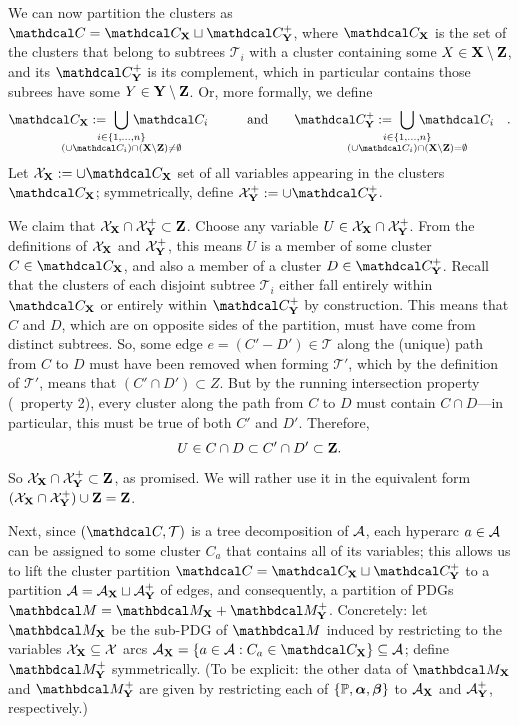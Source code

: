 \begin{subappendices}
\begin{lproof}
    \def\CX{\C_{\mat X}}
    \def\CNX{\C_{\mat{Y}}^+}
    We can now partition the clusters as $\C = \CX \sqcup \CNX$, where
    $\CX$ is the set of the clusters that belong to subtrees $\mathcal T_i$ with a cluster containing some $X \in \mathbf X \setminus \mathbf Z$, and
    its $\CNX$ is its complement, which in particular contains those subrees have some $Y \in \mathbf Y \setminus \mathbf Z$.
    Or, more formally, we define
    \[
        \CX :=~ \bigcup_{\mathclap{\substack{i \in \{1,\ldots,n\}\\ (\cup\C_i) \cap (\mat X\setminus\mat Z) \ne \emptyset }}}\, \C_i
        \quad\qquad \text{and}\qquad
        \CNX :=~ \bigcup_{\mathclap{\substack{i \in \{1,\ldots,n\}\\ (\cup\C_i) \cap (\mat X\setminus\mat Z) = \emptyset }}}\, \C_i
        \quad.
    \]
    \def\XX{\X_{\mat X}}
    \def\XNX{\X_{\mat Y}^+}
    Let $\XX := \cup \CX$ set of all variables appearing in the clusters $\CX$; symmetrically, define $\XNX := \cup \CNX$.


    We claim that $\XX \cap \XNX \subset \mat Z$.
    Choose any variable $U \in \XX \cap \XNX$.
    From the definitions of $\XX$ and $\XNX$, this means $U$ is a member of some cluster $C \in \CX$, and also a member of a cluster $D \in \CNX$.
    Recall that the clusters of each disjoint subtree $\mathcal T_i$ either fall entirely within $\CX$ or entirely within $\CNX$ by construction.
    This means that $C$ and $D$, which are on opposite sides of the partition, must have come from distinct subtrees.
    So, some edge $e = (C'{-}D') \in \mathcal T$ along the (unique) path from $C$ to $D$ must have been removed when forming $\mathcal T'$, which by the definition of $\mathcal T'$, means that $(C' \cap D') \subset Z$.
    But by the running intersection property (\actree\ property 2), every cluster along the path from $C$ to $D$ must contain $C \cap D$---in particular, this must be true of both $C'$ and $D'$.
    Therefore,
    \[
        U \in C \cap D \subset C' \cap D' \subset \mathbf Z.
    \]
    So $\XX \cap \XNX \subset \mat Z$, as promised.  We will rather use it in the equivalent form $(\XX \cap \XNX) \cup \mat Z = \mat Z$.

    Next, since $(\C, \cal T)$ is a tree decomposition of $\mathcal A$, each hyperarc $a \in \mathcal A$ can be assigned to some cluster $C_a$ that contains all of its variables; this allows us to lift the cluster partition $\C = \CX \sqcup \CNX$ to a partition $\mathcal A = \mathcal A_{\mathbf X} \sqcup \mathcal A_{\mathbf Y}^+$ of edges, and consequently, a partition of PDGs $\dg M = \dg M_{\mat X} \bundle \dg M_{\mat Y}^+$.
    Concretely: let $\dg M_{\mat X}$ be the sub-PDG of $\dg M$ induced by restricting to the variables $\XX \subseteq \X$ arcs $\Ar_{\mat X} = \{ a \in \Ar : C_a \in \CX \} \subseteq \Ar$; define $\dg M_{\mat Y}^+$ symmetrically. (To be explicit: the other data of $\dg M_{\mat X}$ and $\dg M_{\mat Y}^+$ are given by restricting each of $\{\mathbb P,\boldsymbol\alpha,\boldsymbol\beta\}$ to $\mathcal A_{\mathbf X}$ and $\mathcal A_{\mathbf Y}^+$, respectively.)


\end{lproof}
\end{subappendices}
